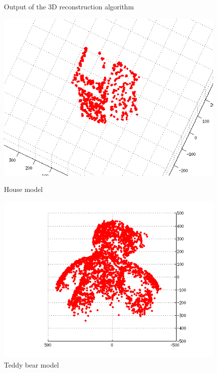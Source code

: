 \documentclass[a4paper,10pt]{article}
\begin{document}
\begin{figure}[ht]
\caption{Output of the 3D reconstruction algorithm}
\begin{minipage}[b]{0.45\linewidth}
\centering
\includegraphics[width=\textwidth]{cloud_house1}
\caption{House model}
\label{fig:figure1}
\end{minipage}
\hspace{0.5cm}
\begin{minipage}[b]{0.45\linewidth}
\centering
\includegraphics[width=\textwidth]{cloud_teddy1}
\caption{Teddy bear model}
\label{fig:figure2}
\end{minipage}
\label{fig:clouds}
\end{figure}
\end{document}
